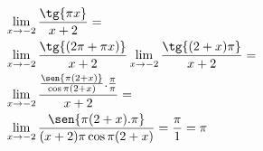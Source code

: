 \begin{ex}
\begin{align}
&\lim_{x\rightarrow -2} \frac{\tg{\pi x}}{x+2}=\nonumber\\
&\lim_{x\rightarrow -2} \frac{\tg{(2\pi +\pi x)}}{x+2}\lim_{x\rightarrow -2} \frac{\tg{(2+x)\pi}}{x+2}=\nonumber\\
&\lim_{x\rightarrow -2} \frac{\frac{\sen{\pi(2+x)}}{\cos{\pi(2+x)}}.\frac{\pi}{\pi}}{x+2}=\nonumber\\
&\lim_{x\rightarrow -2} \frac{\sen{\pi(2+x).\pi}}{(x+2)\pi\cos{\pi(2+x)}}=\frac{\pi}{1}=\pi\nonumber
\end{align}
\end{ex}